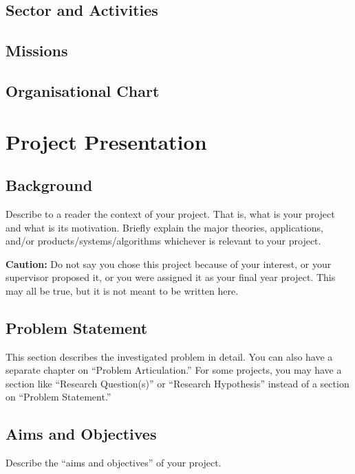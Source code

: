 \subsection{Sector and Activities}
\subsection{Missions}
\subsection{Organisational Chart}

\section{Project Presentation}
\label{sec:proj_pres}

\subsection{Background}
\label{sec:into_back}
Describe to a reader the context of your project. That is, what is your project 
and what is its motivation. Briefly explain the major theories, applications, 
and/or products/systems/algorithms whichever is relevant to your project.

\textbf{Caution:} Do not say you chose this project because of your interest, 
or your supervisor proposed it, or you were assigned it as your final year project. 
This may all be true, but it is not meant to be written here.

\subsection{Problem Statement}
\label{sec:intro_prob_art}
This section describes the investigated problem in detail. You can also have a 
separate chapter on ``Problem Articulation.'' For some projects, you may have a 
section like ``Research Question(s)'' or ``Research Hypothesis'' instead of a 
section on ``Problem Statement.''

\subsection{Aims and Objectives}
\label{sec:intro_aims_obj}
Describe the ``aims and objectives'' of your project.


